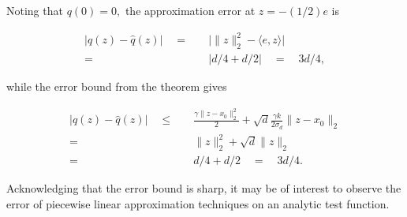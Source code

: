 \documentclass[smallextended,final]{svjour3}  %
\begin{document}
\noindent Noting that $q(0) = 0,$ the approximation error at $z =
-(1/2)e$ is

\vspace{-2mm}
\begin{align*}
  \big|q(z) - \hat q(z)\big| \quad
  =& \quad \big|\|z\|_2^2 - \langle e,z \rangle\big| \\
  =& \quad \big| d/4 + d/2 \big| \quad = \quad 3d/4,
\end{align*}
\vspace{-2mm}

\noindent while the error bound from the theorem gives

\vspace{-2mm}
\begin{align*}
  \big|q(z) - \hat q(z)\big| \quad
  \leq& \quad \frac{\gamma \|z - x_0\|_2^2}{2} + \sqrt{d} \frac{\gamma k}
      {2 \sigma_d} \|z - x_0\|_2 \\
  =& \quad \|z\|_2^2 + \sqrt{d} \|z\|_2 \\
  =& \quad d/4 + d/2 \quad = \quad 3d/4.
\end{align*}
\vspace{-2mm}

\noindent Acknowledging that the error bound is sharp, it may be of
interest to observe the error of piecewise linear approximation
techniques on an analytic test function.
\end{document}
